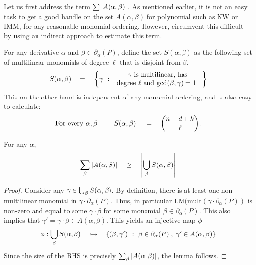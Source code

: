 \documentclass[12pt]{report}
\newcommand{\NW}{\mathrm{NW}}
\newcommand{\IMM}{\mathrm{IMM}}
\begin{document}
 Let us first address the term $\sum \left|A(\alpha, \beta)\right|$. As mentioned earlier, it is not an easy task to get a good handle on the set $A(\alpha, \beta)$ for polynomial such as $\NW$ or $\IMM$, for any reasonable monomial ordering. However, \cite{KS14} circumvent this difficult by using an indirect approach to estimate this term. 

For any derivative $\alpha$ and $\beta \in \partial_\alpha(P)$, define the set $S(\alpha, \beta)$ as the following set of multilinear monomials of degree $\ell$ that is disjoint from $\beta$. 
\[
S(\alpha, \beta) \quad = \quad \left\{{\gamma}\ : \ {\begin{array}{c}\text{$\gamma$ is multilinear, has}\\\text{degree $\ell$ and $\gcd(\beta,\gamma)=1$ }\end{array}}\right\}
\]
This on the other hand is independent of any monomial ordering, and is also easy to calculate:
\[
\text{For every $\alpha, \beta$}\quad\quad \left|S(\alpha, \beta)\right| \quad = \quad \binom{n - d + k}{\ell}.
\] 
\begin{lemma}[\cite{KS14}]\label{lem:As-to-Ss}
For any $\alpha$, 
\[
\sum_{\beta} \left|A(\alpha, \beta)\right| \quad \geq \quad \left|\bigcup_{\beta} S(\alpha, \beta)\right|
\]
\end{lemma}
\begin{proof}
Consider any $\gamma \in \bigcup_{\beta}S(\alpha, \beta)$. By definition, there is at least one non-multilinear monomial in $\gamma \cdot \partial_\alpha(P)$. Thus, in particular $\mathrm{LM}(\mathrm{mult}(\gamma \cdot \partial_\alpha(P))$ is non-zero and equal to some $\gamma \cdot \beta$ for some monomial $\beta \in \partial_\alpha(P)$. This also implies that $\gamma' = \gamma\cdot \beta \in A(\alpha, \beta)$. This yields an injective map $\phi$ 
\[
\phi:\bigcup_\beta S(\alpha,\beta) \quad \rightarrowtail \quad \left\{{(\beta, \gamma')}\ : \ {\beta\in \partial_\alpha(P)\;,\;\gamma' \in A(\alpha, \beta)}\right\}
\] 
Since the size of the RHS is precisely $\sum_\beta \left|A(\alpha, \beta)\right|$, the lemma follows. 
\end{proof}
\end{document}
